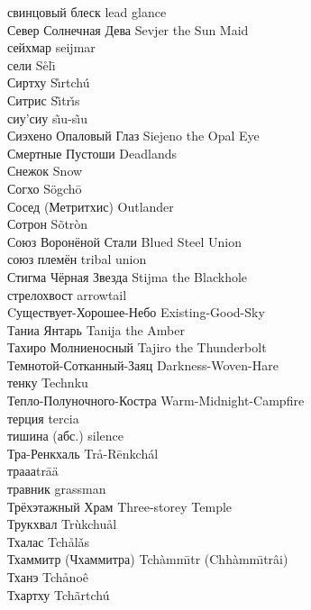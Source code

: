 свинцовый блеск \hfill lead glance\\
Север Солнечная Дева \hfill Sevjer the Sun Maid\\
сейхмар \hfill seijmar\\
сели \hfill S\r{e}l\={\i}\\
Сиртху \hfill S\r{\i}rtch\'{u}\\
Ситрис \hfill S\~{\i}tr\v{\i}s\\
сиу'сиу \hfill s\~{\i}u-s\~{\i}u\\
Сиэхено Опаловый Глаз \hfill Siejeno the Opal Eye\\
Смертные Пустоши \hfill Deadlands\\
Снежок \hfill Snow\\
Согхо \hfill S\"{o}gch\={o}\\
Сосед (Метритхис) \hfill Outlander\\
Сотрон \hfill S\~{o}tr\`{o}n\\
Союз Воронёной Стали \hfill Blued Steel Union\\
союз племён \hfill tribal union\\
Стигма Чёрная Звезда \hfill Stijma the Blackhole\\
стрелохвост \hfill arrowtail\\
Cуществует-Хорошее-Небо \hfill Existing-Good-Sky\\
Таниа Янтарь \hfill Tanija the Amber\\
Тахиро Молниеносный \hfill Tajiro the Thunderbolt\\
Темнотой-Сотканный-Заяц \hfill Darkness-Woven-Hare\\
тенку \hfill Technku\\
Тепло-Полуночного-Костра \hfill Warm-Midnight-Campfire\\
терция \hfill tercia\\
тишина (абс.) \hfill silence\\
Тра-Ренкхаль \hfill Tr\r{a}-R\={e}nkch\'{a}l\\
трааа\ldotst \hfill tr\={a}\"{a}\ldotst \\
травник \hfill grassman\\
Трёхэтажный Храм \hfill Three-storey Temple\\
Трукхвал \hfill Tr\`{u}kchu\r{a}l\\
Тхалас \hfill Tch\r{a}l\v{a}s\\
Тхаммитр (Чхаммитра) \hfill Tch\`{a}mm\={\i}tr (Chh\`{a}mm\={\i}tr\^{a}i)\\
Тханэ \hfill Tch\r{a}no\^{e}\\
Тхартху \hfill Tch\~{a}rtch\'{u}\\

